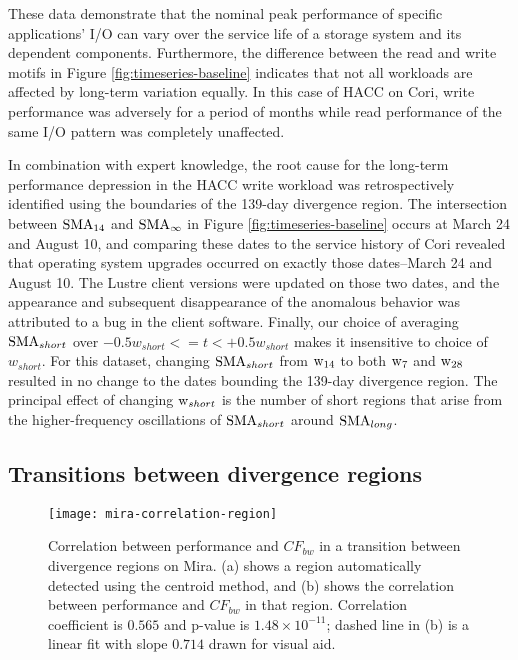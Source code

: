 These data demonstrate that the nominal peak performance of specific applications' I/O can vary over the service life of a storage system and its dependent components.
Furthermore, the difference between the read and write motifs in Figure \ref{fig:timeseries-baseline} indicates that not all workloads are affected by long-term variation equally. 
In this case of HACC on Cori, write performance was adversely for a period of months while read performance of the same I/O pattern was completely unaffected.

In combination with expert knowledge, the root cause for the long-term performance depression in the HACC write workload was retrospectively identified using the boundaries of the 139-day divergence region.
The intersection between $\textup{SMA}_{14}$ and $\textup{SMA}_\infty$ in Figure \ref{fig:timeseries-baseline} occurs at March 24 and August 10, and comparing these dates to the service history of Cori revealed that operating system upgrades occurred on exactly those dates--March 24 and August 10.
The Lustre client versions were updated on those two dates, and the appearance and subsequent disappearance of the anomalous behavior was attributed to a bug in the client software.
Finally, our choice of averaging $\textup{SMA}_{short}$ over ${-0.5w_{short} <= t < +0.5w_{short}}$ makes it insensitive to choice of $w_{short}$.
For this dataset, changing $\textup{SMA}_{short}$ from $\textup{w}_{14}$ to both $\textup{w}_{7}$ and $\textup{w}_{28}$ resulted in no change to the dates bounding the 139-day divergence region.
The principal effect of changing $\textup{w}_{short}$ is the number of short regions that arise from the higher-frequency oscillations of $\textup{SMA}_{short}$ around $\textup{SMA}_{long}$.





\subsection{Transitions between divergence regions} \label{sec:results/transitions}

\begin{figure}
    \centering
    \texttt{[image: mira-correlation-region]}
    \vspace{-.35in}
    \caption{Correlation between performance and $CF_{bw}$ in a transition between divergence regions on Mira. (a) shows a region automatically detected using the centroid method, and (b) shows the correlation between performance and $CF_{bw}$ in that region.  Correlation coefficient is $0.565$ and p-value is ${1.48 \times 10^{-11}}$; dashed line in (b) is a linear fit with slope $0.714$ drawn for visual aid.}
    \label{fig:mira-correlation-region}
\end{figure}

